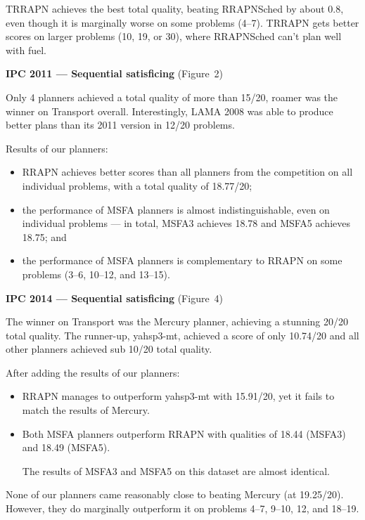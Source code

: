 \documentclass[a0paper,fontscale=0.285]{baposter} %
\begin{document}
\begin{poster}
{\begin{multicols}{3}
TRRAPN achieves the best total quality,
beating RRAPNSched by about 0.8,
even though it is marginally worse on some problems (4--7). TRRAPN gets better scores on
larger problems (10, 19, or 30), where RRAPNSched can't plan well with fuel.


\vspace{0.15cm}
\textbf{IPC 2011 --- Sequential satisficing} (Figure~2)
\vspace{0.15cm}

Only 4 planners achieved a total quality of more than 15/20, roamer was the winner on Transport overall.
Interestingly, LAMA 2008 was able to produce better plans than its 2011 version in 12/20 problems.

Results of our planners:
\begin{itemize}
\item RRAPN achieves better scores than all planners from the competition on all individual problems, with a total quality of 18.77/20;
\item the performance of MSFA planners
is almost indistinguishable, even on individual problems --- in total, MSFA3 achieves 18.78 and MSFA5 achieves 18.75; and
\item the performance of MSFA planners is complementary to RRAPN on some problems (3--6, 10--12, and 13--15).
\end{itemize}

\vspace{0.15cm}
\textbf{IPC 2014 --- Sequential satisficing} (Figure~4)
\vspace{0.15cm}

The winner on Transport was the Mercury planner, achieving
a stunning 20/20 total quality. The runner-up, yahsp3-mt, achieved a score of only 10.74/20
and all other planners achieved sub 10/20 total quality.

After adding the results of our planners:
\begin{itemize}
\item RRAPN manages to outperform yahsp3-mt with 15.91/20, yet it fails
to match the results of Mercury.
\item Both MSFA planners outperform RRAPN with qualities of 18.44 (MSFA3)
and 18.49 (MSFA5).

The results of MSFA3 and MSFA5 on this dataset are almost identical.
\end{itemize}
None of our planners came reasonably close to beating Mercury (at 19.25/20).
However, they do marginally outperform it on problems 4--7, 9--10, 12, and 18--19.
\end{multicols}

}
\end{poster}
\end{document}
